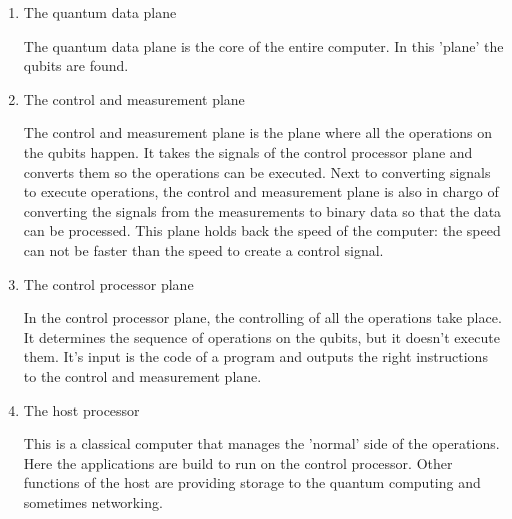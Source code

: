 \begin{enumerate}
    \item The quantum data plane

        \quad The quantum data plane is the core of the entire computer. In this 'plane' the qubits are found.

         
    \item The control and measurement plane

        \quad The control and measurement plane is the plane where all the operations on the qubits happen. It takes the signals of the control processor plane and converts them so the operations can be executed.
        Next to converting signals to execute operations, the control and measurement plane is also in chargo of converting the signals from the measurements to binary data so that the data can be processed.
        This plane holds back the speed of the computer: the speed can not be faster than the speed to create a control signal.

    \item The control processor plane

        \quad In the control processor plane, the controlling of all the operations take place. It determines the sequence of operations on the qubits, but it doesn't execute them. It's input is the code of a program and outputs the right instructions to the control and measurement plane.

    \item The host processor

        \quad This is a classical computer that manages the 'normal' side of the operations. Here the applications are build to run on the control processor. Other functions of the host are providing storage to the quantum computing and sometimes networking.

\end{enumerate}